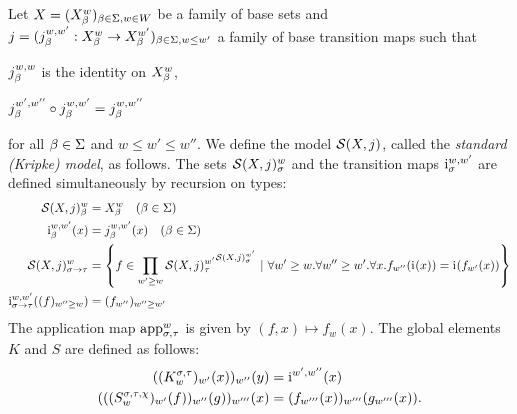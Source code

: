 \begin{ex} \label{ex:standard-Kripke-model}
Let $X = (X_{\beta}^{w})_{\beta \in \Sigma, w \in W}$ be a family of base sets and $j = (j_{\beta}^{w,w'} : X_{\beta}^{w} \to X_{\beta}^{w'})_{\beta \in \Sigma, w \le w'}$ a family of base transition maps such that
\begin{items}
    \item $j_{\beta}^{w,w}$ is the identity on $X_{\beta}^{w}$,
    \item $j_{\beta}^{w',w''} \circ j_{\beta}^{w,w'} = j_{\beta}^{w,w''}$
\end{items}
for all $\beta \in \Sigma$ and $w \le w' \le w''$. We define the model $\mathcal{S}(X, j)$, called the \emph{standard (Kripke) model}, as follows. The sets $\mathcal{S}(X, j)_{\sigma}^{w}$ and the transition maps $\kstran[\sigma][w,w']$ are defined simultaneously by recursion on types:
\begin{align*}
\kscomp{\kstdmod{X}{j}}{\beta}{w}
    &= \kscomp{X}{\beta}{w} \quad (\beta \in \Basetypes) \\
\kstran[\beta][w,w'](x) &= \kscomp{j}{\beta}{w,w'}(x) \quad (\beta \in \Basetypes) \\
\kscomp{\kstdmod{X}{j}}{\functy{\sigma}{\tau}}{w}
    &= \setof{f \in \prod_{w' \ge w}{\funcset{\kscomp{\kstdmod{X}{j}}{\sigma}{w'}}{{\kscomp{\kstdmod{X}{j}}{\tau}{w'}}}}}{\forall w' \ge w. \forall w'' \ge w'. \forall x. f_{w''}(\kstran(x)) = \kstran(f_{w'}(x))} \\
\kstran[\functy{\sigma}{\tau}][w,w']((f)_{w'' \ge w}) &= (f_{w''})_{w'' \ge w'}
\end{align*}
The application map $\ksapp[\sigma,\tau][w]$ is given by $(f, x) \mapsto f_w(x)$. The global elements $K$ and $S$ are defined as follows:
\begin{align*}
((K^{\sigma,\tau}_w)_{w'}(x))_{w''}(y) &= \kstran[][w',w''](x) \\
(((S^{\sigma,\tau,\chi}_w)_{w'}(f))_{w''}(g))_{w'''}(x) &= (f_{w'''}(x))_{w'''}(g_{w'''}(x)).
\end{align*}

\end{ex}


